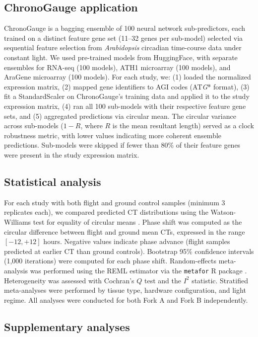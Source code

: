 \documentclass[11pt,a4paper]{article}
\begin{document}
\subsection*{ChronoGauge application}

ChronoGauge \citep{Reynolds2025} is a bagging ensemble of 100 neural network sub-predictors, each trained on a distinct feature gene set (11--32 genes per sub-model) selected via sequential feature selection from \textit{Arabidopsis} circadian time-course data under constant light. We used pre-trained models from HuggingFace, with separate ensembles for RNA-seq (100 models), ATH1 microarray (100 models), and AraGene microarray (100 models). For each study, we: (1) loaded the normalized expression matrix, (2) mapped gene identifiers to AGI codes (AT\textit{G}* format), (3) fit a StandardScaler on ChronoGauge's training data and applied it to the study expression matrix, (4) ran all 100 sub-models with their respective feature gene sets, and (5) aggregated predictions via circular mean. The circular variance across sub-models ($1 - R$, where $R$ is the mean resultant length) served as a clock robustness metric, with lower values indicating more coherent ensemble predictions. Sub-models were skipped if fewer than 80\% of their feature genes were present in the study expression matrix.

\subsection*{Statistical analysis}

For each study with both flight and ground control samples (minimum 3 replicates each), we compared predicted CT distributions using the Watson-Williams test for equality of circular means \citep{Watson1956}. Phase shift was computed as the circular difference between flight and ground mean CTs, expressed in the range $[-12, +12]$ hours. Negative values indicate phase advance (flight samples predicted at earlier CT than ground controls). Bootstrap 95\% confidence intervals (1,000 iterations) were computed for each phase shift. Random-effects meta-analysis was performed using the REML estimator via the \texttt{metafor} R package \citep{Viechtbauer2010}. Heterogeneity was assessed with Cochran's $Q$ test and the $I^2$ statistic. Stratified meta-analyses were performed by tissue type, hardware configuration, and light regime. All analyses were conducted for both Fork A and Fork B independently.

\subsection*{Supplementary analyses}
\end{document}

